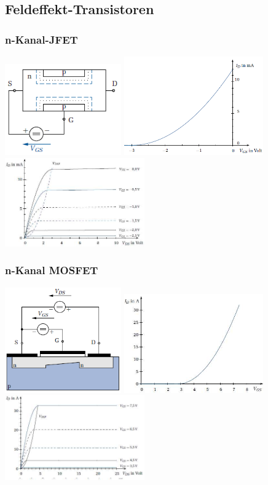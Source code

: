 \subsection{Feldeffekt-Transistoren}

\subsubsection{n-Kanal-JFET}
\includegraphics[width=5cm]{bilder/jFET}
\includegraphics[width=6cm]{bilder/jFetSteuerKennlinie}
\includegraphics[width=6cm]{bilder/jFetAusgangsKennlinie}\\

\subsubsection{n-Kanal MOSFET}

\includegraphics[width=5cm]{bilder/MOSFET}
\includegraphics[width=6cm]{bilder/MOSFETSteuerKennlinie}
\includegraphics[width=6cm]{bilder/MOSFETAusgangsKennlinie}\\
